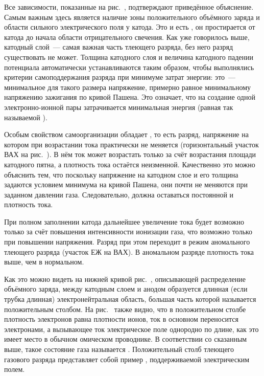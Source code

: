 Все зависимости, показанные на рис.~, подтверждают приведённое объяснение. Самым важным здесь является наличие зоны
положительного объёмного заряда и области сильного электрического поля у катода. Это и есть , он
простирается от катода до начала области отрицательного свечения. Как уже говорилось выше, катодный слой~--- самая
важная часть тлеющего разряда, без него разряд существовать не может. Толщина катодного слоя и величина катодного падении
потенциала автоматически устанавливаются таким образом, чтобы выполнялись критерии самоподдержания разряда при минимуме
затрат энергии: это~--- минимальное для такого размера напряжение, примерно равное минимальному напряжению зажигания по
кривой Пашена. Это означает, что на создание одной электронно-ионной пары затрачивается минимальная энергия (равная так
называемой ).

Особым свойством самоорганизации обладает  , то есть разряд, напряжение на котором при
возрастании тока практически не меняется (горизонтальный участок ВАХ на рис.~). В нём ток может возрастать только
за счёт возрастания площади катодного пятна, а плотность тока остаётся неизменной. Качественно это можно объяснить тем,
что поскольку напряжение на катодном слое и его толщина задаются условием минимума на кривой Пашена, они почти не
меняются при заданном давлении газа. Следовательно, должна оставаться постоянной и плотность тока.

При полном заполнении катода дальнейшее увеличение тока будет возможно только за счёт повышения интенсивности ионизации
газа, что возможно только при повышении напряжения. Разряд при этом переходит в режим аномального тлеющего разряда
(участок ЕЖ на ВАХ). В аномальном разряде плотность тока выше, чем в нормальном.

Как это можно видеть на нижней кривой рис.~, описывающей распределение объёмного заряда, между катодным слоем и анодом
образуется длинная (если трубка длинная) электронейтральная область, большая часть которой называется положительным
столбом. На рис.~ также видно, что в положительном столбе плотность электронов равна плотности ионов, ток в основном
переносится электронами, а вызывающее ток электрическое поле однородно по длине, как это имеет место в обычном омическом
проводнике. В соответствии со сказанным выше, такое состояние газа называется . Положительный столб
тлеющего газового разряда представляет собой пример , поддерживаемой электрическим полем.

